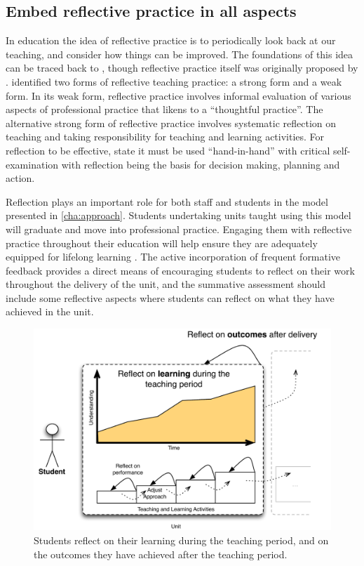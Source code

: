 
\subsection{Embed reflective practice in all aspects} %
\label{ssub:embed_reflective_practice_in_all_aspects}

In education the idea of reflective practice is to periodically look back at our teaching, and consider how things can be improved. The foundations of this idea can be traced back to \citet{Dewey:1933}, though reflective practice itself was originally proposed by \citet{Schon:1983}. \citet{Farrell:2007,Farrell:2008} identified two forms of reflective teaching practice: a strong form and a weak form. In its weak form, reflective practice involves informal evaluation of various aspects of professional practice that \citet{Farrell:2008} likens to a ``thoughtful practice''. The alternative strong form of reflective practice involves systematic reflection on teaching and taking responsibility for teaching and learning activities. For reflection to be effective, \citet{Richards:1994} state it must be used ``hand-in-hand'' with critical self-examination with reflection being the basis for decision making, planning and action.

Reflection plays an important role for both staff and students in the model presented in \cref{cha:approach}. Students undertaking units taught using this model will graduate and move into professional practice. Engaging them with reflective practice throughout their education will help ensure they are adequately equipped for lifelong learning \cite{Field:2006}. The active incorporation of frequent formative feedback provides a direct means of encouraging students to reflect on their work throughout the delivery of the unit, and the summative assessment should include some reflective aspects where students can reflect on what they have achieved in the unit.

\begin{figure}[ptbh]
	\centering
	\includegraphics[width=\textwidth]{StudentReflection}
	\caption{Students reflect on their learning during the teaching period, and on the outcomes they have achieved after the teaching period.}
	\label{fig:student_reflection}
\end{figure}

